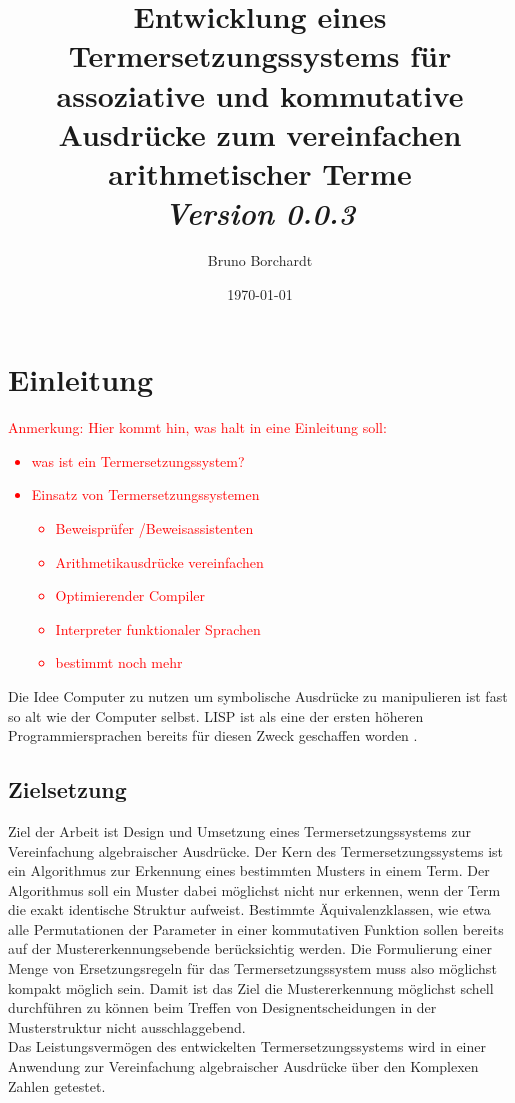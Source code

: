 \documentclass{scrartcl}
\title{Entwicklung eines Termersetzungssystems für assoziative und kommutative Ausdrücke zum vereinfachen arithmetischer Terme\\ \textit{Version 0.0.3}}
\author{Bruno Borchardt}
\date{\today}
\numberwithin{figure}{section} %
\theoremstyle{definition} %
\begin{document}
\maketitle

\tableofcontents

\clearpage

\section{Einleitung} \label{secEinleitung}
\textcolor{red} {
\begin{itshape}
Anmerkung: Hier kommt hin, was halt in eine Einleitung soll:
\begin{itemize}
    \item was ist ein Termersetzungssystem?
    \item Einsatz von Termersetzungssystemen
    \begin{itemize}
        \item Beweisprüfer /Beweisassistenten
        \item Arithmetikausdrücke vereinfachen
        \item Optimierender Compiler
        \item Interpreter funktionaler Sprachen
        \item bestimmt noch mehr
    \end{itemize}
\end{itemize}
\end{itshape}
}

Die Idee Computer zu nutzen um symbolische Ausdrücke zu manipulieren ist fast so alt wie der Computer selbst.  LISP ist als eine der ersten höheren Programmiersprachen bereits für diesen Zweck geschaffen worden \cite{lisp}. 

\subsection{Zielsetzung}
Ziel der Arbeit ist Design und Umsetzung eines Termersetzungssystems zur Vereinfachung algebraischer Ausdrücke. Der Kern des Termersetzungssystems ist ein Algorithmus zur Erkennung eines bestimmten Musters in einem Term. 
Der Algorithmus soll ein Muster dabei möglichst nicht nur erkennen, wenn der Term die exakt identische Struktur aufweist. Bestimmte Äquivalenzklassen, wie etwa alle Permutationen der Parameter in einer kommutativen Funktion sollen bereits auf der Mustererkennungsebende berücksichtig werden. Die Formulierung einer Menge von Ersetzungsregeln für das Termersetzungssystem muss also möglichst kompakt möglich sein. 
Damit ist das Ziel die Mustererkennung möglichst schell durchführen zu können beim Treffen von Designentscheidungen in der Musterstruktur nicht ausschlaggebend. \\
Das Leistungsvermögen des entwickelten Termersetzungssystems wird in einer Anwendung zur Vereinfachung algebraischer Ausdrücke über den Komplexen Zahlen getestet. 
\end{document}

